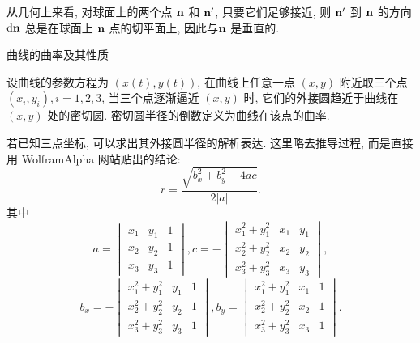 从几何上来看, 对球面上的两个点 $\bold{n}$ 和 $\bold{n}'$, 只要它们足够接近, 则 $\bold{n}'$ 到 $\bold{n}$ 的方向 $\mathrm{d}\bold{n}$ 总是在球面上 $\bold{n}$ 点的切平面上, 因此与$\bold{n}$ 是垂直的.


\newpage
\noindent 曲线的曲率及其性质

设曲线的参数方程为 $(x(t), y(t))$, 在曲线上任意一点 $(x,y)$ 附近取三个点 $(x_i, y_i), i=1,2,3$, 当三个点逐渐逼近 $(x,y)$ 时, 它们的外接圆趋近于曲线在 $(x,y)$ 处的密切圆. 密切圆半径的倒数定义为曲线在该点的曲率.
\begin{figure*}[htbp]
\centering
{}
\end{figure*}

若已知三点坐标, 可以求出其外接圆半径的解析表达. 这里略去推导过程, 而是直接用 WolframAlpha 网站贴出的结论:
\[r = \frac{\sqrt{b_x^2+b_y^2-4ac}}{2|a|} .\]
其中
\[
a = \begin{vmatrix}
x_1 & y_1 & 1 \\ 
x_2 & y_2 & 1 \\ 
x_3 & y_3 & 1
\end{vmatrix},  c = -\begin{vmatrix}
x_1^2 + y_1^2& x_1 & y_1 \\ 
x_2^2 + y_2^2& x_2 & y_2 \\ 
x_3^2 + y_3^2& x_3 & y_3
\end{vmatrix}, \]\[
b_x = -\begin{vmatrix}
x_1^2 + y_1^2& y_1 & 1 \\ 
x_2^2 + y_2^2& y_2 & 1 \\ 
x_3^2 + y_3^2& y_3 & 1
\end{vmatrix}, b_y = \begin{vmatrix}
x_1^2 + y_1^2& x_1 & 1 \\ 
x_2^2 + y_2^2& x_2 & 1 \\ 
x_3^2 + y_3^2& x_3 & 1
\end{vmatrix}.
\]

